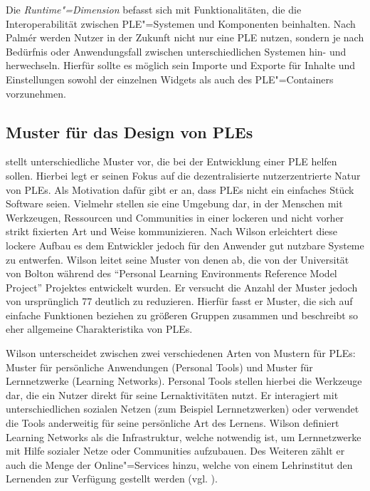 Die \emph{Runtime"=Dimension} befasst sich mit Funktionalitäten, die die Interoperabilität zwischen \ac{PLE}"=Systemen und Komponenten beinhalten. Nach Palmér werden Nutzer in der Zukunft nicht nur eine \ac{PLE} nutzen, sondern je nach Bedürfnis oder Anwendungsfall zwischen unterschiedlichen Systemen hin- und herwechseln. Hierfür sollte es möglich sein Importe und Exporte für Inhalte und Einstellungen sowohl der einzelnen Widgets als auch des \ac{PLE}"=Containers vorzunehmen.

\subsection{Muster für das Design von \acp{PLE}}\label{section:wilson_patterns}
\cite{Wilson2008} stellt unterschiedliche Muster vor, die bei der Entwicklung einer \ac{PLE} helfen sollen. Hierbei legt er seinen Fokus auf die dezentralisierte  nutzerzentrierte Natur von \acp{PLE}. Als Motivation dafür gibt er an, dass \acp{PLE} nicht ein einfaches Stück Software seien. Vielmehr stellen sie eine Umgebung dar, in der Menschen mit Werkzeugen, Ressourcen und Communities in einer lockeren und nicht vorher strikt fixierten Art und Weise kommunizieren. Nach Wilson erleichtert diese lockere Aufbau es dem Entwickler jedoch für den Anwender gut nutzbare Systeme zu entwerfen. Wilson leitet seine Muster von denen ab, die von der Universität von Bolton während des "`Personal Learning Environments Reference Model Project"' Projektes entwickelt wurden. Er versucht die Anzahl der Muster jedoch von ursprünglich 77 deutlich zu reduzieren. Hierfür fasst er Muster, die sich auf einfache Funktionen beziehen zu größeren Gruppen zusammen und beschreibt so eher allgemeine Charakteristika von \acp{PLE}.

Wilson unterscheidet zwischen zwei verschiedenen Arten von Mustern für \acp{PLE}: Muster für persönliche Anwendungen (Personal Tools) und Muster für Lernnetzwerke (Learning Networks). Personal Tools stellen hierbei die Werkzeuge dar, die ein Nutzer direkt für seine Lernaktivitäten nutzt. Er interagiert mit unterschiedlichen sozialen Netzen (zum Beispiel Lernnetzwerken) oder verwendet die Tools anderweitig für seine persönliche Art des Lernens. 
Wilson definiert Learning Networks als die Infrastruktur, welche notwendig ist, um Lernnetzwerke mit Hilfe sozialer Netze oder Communities aufzubauen. Des Weiteren zählt er auch die Menge der Online"=Services hinzu, welche von einem Lehrinstitut den Lernenden zur Verfügung gestellt werden (vgl. \cite{Wilson2008}).


